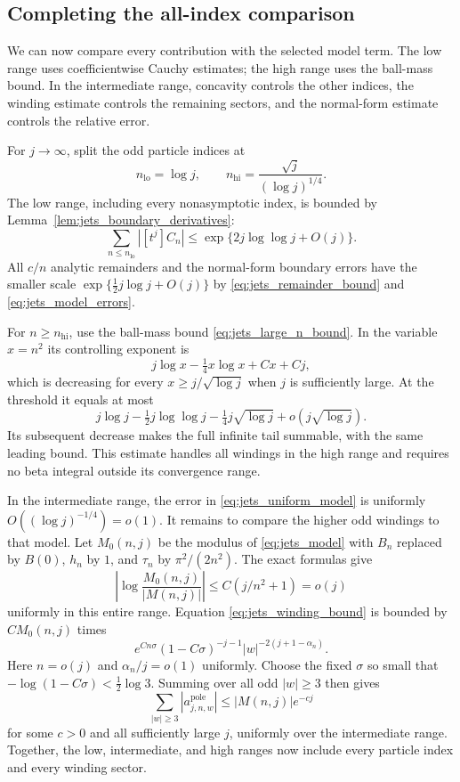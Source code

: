 \documentclass[11pt]{article}
\numberwithin{equation}{section}
\theoremstyle{definition}
\begin{document}
\subsection{Completing the all-index comparison}

We can now compare every contribution with the selected model term.
The low range uses coefficientwise Cauchy estimates; the high range uses
the ball-mass bound. In the intermediate range, concavity controls the
other indices, the winding estimate controls the remaining sectors,
and the normal-form estimate controls the relative error.

For $j\to\infty$, split the odd particle indices at
\[
 n_{\mathrm{lo}}=\log j,\qquad
 n_{\mathrm{hi}}=\frac{\sqrt j}{(\log j)^{1/4}}.
\]
The low range, including every nonasymptotic index, is bounded by
Lemma~\ref{lem:jets_boundary_derivatives}:
\begin{equation}\label{eq:jets_low_range}
 \sum_{n\le n_{\mathrm{lo}}}|[t^j]C_n|
 \le\exp\{2j\log\log j+O(j)\}.
\end{equation}
All $c/n$ analytic remainders and the normal-form boundary errors
have the smaller scale
$\exp\{\tfrac12j\log j+O(j)\}$ by
\eqref{eq:jets_remainder_bound} and
\eqref{eq:jets_model_errors}.

For $n\ge n_{\mathrm{hi}}$, use the ball-mass bound
\eqref{eq:jets_large_n_bound}. In the variable $x=n^2$ its
controlling exponent is
\[
 j\log x-\tfrac14x\log x+Cx+Cj,
\]
which is decreasing for every $x\ge j/\sqrt{\log j}$ when $j$
is sufficiently large. At the threshold it equals at most
\begin{equation}\label{eq:jets_high_range}
 j\log j-\tfrac12j\log\log j-\tfrac14j\sqrt{\log j}
       +o(j\sqrt{\log j}).
\end{equation}
Its subsequent decrease makes the full infinite tail summable,
with the same leading bound. This estimate handles all windings in
the high range and requires no beta integral outside its
convergence range.

In the intermediate range, the error in
\eqref{eq:jets_uniform_model} is uniformly
$O((\log j)^{-1/4})=o(1)$. It remains to compare the higher odd
windings to that model. Let $M_0(n,j)$ be the modulus of
\eqref{eq:jets_model} with $B_n$ replaced by $B(0)$, $h_n$ by
$1$, and $\tau_n$ by $\pi^2/(2n^2)$. The exact formulas give
\begin{equation}\label{eq:jets_baseline_ratio}
 \left|\log\frac{M_0(n,j)}{|M(n,j)|}\right|
 \le C(j/n^2+1)=o(j)
\end{equation}
uniformly in this entire range. Equation
\eqref{eq:jets_winding_bound} is bounded by $CM_0(n,j)$ times
\[
 e^{Cn\sigma}(1-C\sigma)^{-j-1}
 |w|^{-2(j+1-\alpha_n)}.
\]
Here $n=o(j)$ and $\alpha_n/j=o(1)$ uniformly. Choose the fixed
$\sigma$ so small that $-\log(1-C\sigma)<\tfrac12\log3$.
Summing over all odd $|w|\ge3$ then gives
\begin{equation}\label{eq:jets_higher_windings_negligible}
 \sum_{|w|\ge3}|a_{j,n,w}^{\mathrm{pole}}|
 \le |M(n,j)|e^{-c j}
\end{equation}
for some $c>0$ and all sufficiently large $j$, uniformly over the
intermediate range. Together, the low, intermediate, and high ranges now include every
particle index and every winding sector.
\end{document}
